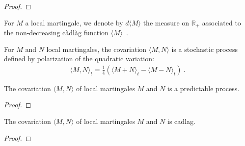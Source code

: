 \begin{proof}

\end{proof}


\begin{definition}\label{def:quadraticVariationMeasure}
For $M$ a local martingale, we denote by $d\langle M \rangle$ the measure on $\mathbb{R}_+$ associated to the non-decreasing càdlàg function $\langle M \rangle$~.
\end{definition}


\begin{definition}[Covariation]\label{def:covariation}
For $M$ and $N$ local martingales, the covariation $\langle M, N \rangle$ is a stochastic process defined by polarization of the quadratic variation:
\begin{align*}
  \langle M, N \rangle_t = \frac{1}{4}\left(\langle M+N \rangle_t - \langle M-N \rangle_t \right)
  \: .
\end{align*}

\end{definition}


\begin{lemma}\label{lem:predictable_covariation}
The covariation $\langle M, N \rangle$ of local martingales $M$ and $N$ is a predictable process.
\end{lemma}

\begin{proof}

\end{proof}


\begin{lemma}\label{lem:cadlag_covariation}
The covariation $\langle M, N \rangle$ of local martingales $M$ and $N$ is cadlag.
\end{lemma}

\begin{proof}

\end{proof}


